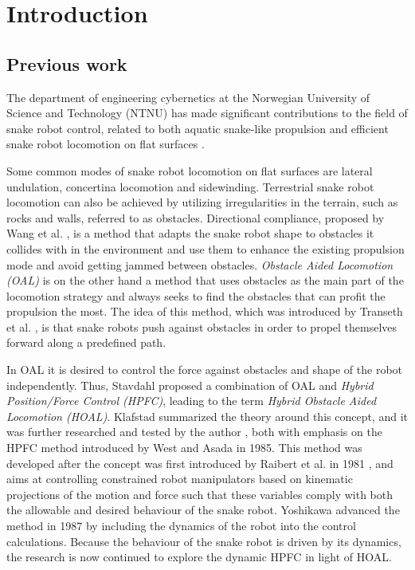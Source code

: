 
\chapter{Introduction}\label{Chapter:introduction}

\section{Previous work}

The department of engineering cybernetics at the Norwegian University of Science and Technology (NTNU) has made significant contributions to the field of snake robot control, related to both aquatic snake-like propulsion and efficient snake robot locomotion on flat surfaces \cite{StavdahlNote}.

Some common modes of snake robot locomotion on flat surfaces are lateral undulation, concertina locomotion and sidewinding. Terrestrial snake robot locomotion can also be achieved by utilizing irregularities in the terrain, such as rocks and walls, referred to as obstacles. Directional compliance, proposed by Wang et al. \cite{wang2020directional}, is a method that adapts the snake robot shape to obstacles it collides with in the environment and use them to enhance the existing propulsion mode and avoid getting jammed between obstacles. \textit{Obstacle Aided Locomotion (OAL)} is on the other hand a method that uses obstacles as the main part of the locomotion strategy and always seeks to find the obstacles that can profit the propulsion the most. The idea of this method, which was introduced by Transeth et al. \cite{transeth2008snake}, is that snake robots push against obstacles in order to propel themselves forward along a predefined path.


In OAL it is desired to control the force against obstacles and shape of the robot independently. Thus, Stavdahl \cite{StavdahlNote} proposed a combination of OAL and \textit{Hybrid Position/Force Control (HPFC)}, leading to the term \textit{Hybrid Obstacle Aided Locomotion (HOAL)}. Klafstad \cite{TorjusOppg} summarized the theory around this concept, and it was further researched and tested by the author \cite{AtussaProsjektoppgp}, both with emphasis on the HPFC method introduced by West and Asada \cite{west1985method} in 1985. This method was developed after the concept was first introduced by Raibert et al. in 1981 \cite{raibert1981hybrid}, and aims at controlling constrained robot manipulators based on kinematic projections of the motion and force such that these variables comply with both the allowable and desired behaviour of the snake robot. Yoshikawa \cite{yoshikawa1987dynamic} advanced the method in 1987 by including the dynamics of the robot into the control calculations. Because the behaviour of the snake robot is driven by its dynamics, the research is now continued to explore the dynamic HPFC in light of HOAL. 


